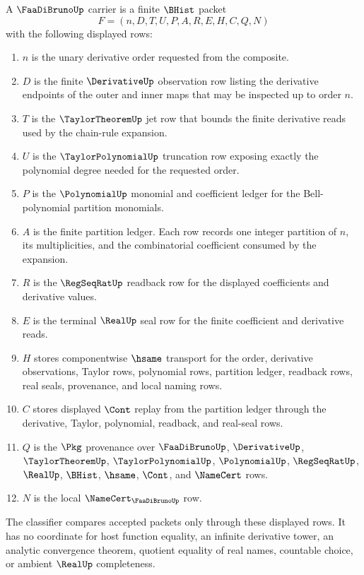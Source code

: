 \begin{definition}
\label{def:faa-di-bruno-carrier}
A $\FaaDiBrunoUp$ carrier is a finite $\BHist$ packet
$$
F=(n,D,T,U,P,A,R,E,H,C,Q,N)
$$
with the following displayed rows:
\begin{enumerate}
\item $n$ is the unary derivative order requested from the composite.
\item $D$ is the finite $\DerivativeUp$ observation row listing the derivative endpoints of the outer and inner maps that may be inspected up to order $n$.
\item $T$ is the $\TaylorTheoremUp$ jet row that bounds the finite derivative reads used by the chain-rule expansion.
\item $U$ is the $\TaylorPolynomialUp$ truncation row exposing exactly the polynomial degree needed for the requested order.
\item $P$ is the $\PolynomialUp$ monomial and coefficient ledger for the Bell-polynomial partition monomials.
\item $A$ is the finite partition ledger. Each row records one integer partition of $n$, its multiplicities, and the combinatorial coefficient consumed by the expansion.
\item $R$ is the $\RegSeqRatUp$ readback row for the displayed coefficients and derivative values.
\item $E$ is the terminal $\RealUp$ seal row for the finite coefficient and derivative reads.
\item $H$ stores componentwise $\hsame$ transport for the order, derivative observations, Taylor rows, polynomial rows, partition ledger, readback rows, real seals, provenance, and local naming rows.
\item $C$ stores displayed $\Cont$ replay from the partition ledger through the derivative, Taylor, polynomial, readback, and real-seal rows.
\item $Q$ is the $\Pkg$ provenance over $\FaaDiBrunoUp$, $\DerivativeUp$, $\TaylorTheoremUp$, $\TaylorPolynomialUp$, $\PolynomialUp$, $\RegSeqRatUp$, $\RealUp$, $\BHist$, $\hsame$, $\Cont$, and $\NameCert$ rows.
\item $N$ is the local $\NameCert_{\FaaDiBrunoUp}$ row.
\end{enumerate}
The classifier compares accepted packets only through these displayed rows. It has no coordinate for host function equality, an infinite derivative tower, an analytic convergence theorem, quotient equality of real names, countable choice, or ambient $\RealUp$ completeness.
\end{definition}

